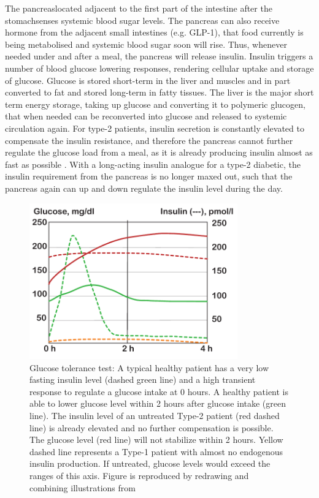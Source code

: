 The pancreas\DIFaddbegin \DIFadd{, }\DIFaddend located adjacent to the first part of the intestine after the stomach\DIFaddbegin \DIFadd{, }\DIFaddend senses systemic blood sugar levels. The pancreas can also receive hormone \DIFdelbegin {}\DIFdelend \DIFaddbegin {}\DIFaddend from the adjacent small intestines (e.g. GLP-1), \DIFaddbegin {}\DIFaddend that food currently is being metabolised and systemic blood sugar soon will rise. Thus, whenever needed under and after a meal, the pancreas will release insulin. Insulin triggers a number of blood glucose lowering responses, rendering cellular uptake and storage of glucose. Glucose is stored short-term in the liver and muscles and in part converted to fat and stored long-term in fatty tissues. The liver is the major short term energy storage, taking up glucose and converting it to polymeric glucogen, that when needed can be reconverted into glucose and released to systemic circulation again. For type-2 patients, insulin secretion is constantly elevated to compensate \DIFaddbegin {}\DIFaddend the insulin resistance, and therefore the pancreas cannot further regulate the glucose load from a meal, as it is already producing insulin almost as fast as possible \cite{silverthorn2010human}. With a long-acting insulin analogue for a type-2 diabetic, the insulin requirement from the pancreas is no longer maxed out, such that the pancreas again can up and down regulate the insulin level during the day.

\begin{figure}[!htpb]
\includegraphics[width=0.8\textwidth,height=0.8\textheight,keepaspectratio]{graphics/glucoseTolerance.pdf}
\caption{Glucose tolerance test: A typical healthy patient has a very low fasting insulin level (dashed green line) and a high transient response to regulate a glucose intake at 0 hours. A healthy patient is able to lower glucose level within 2 hours after glucose intake (green line). The insulin level of an untreated Type-2 patient (red dashed line) is already elevated and no further compensation is possible. The glucose level (red line) will not stabilize within 2 hours. Yellow dashed line represents a Type-1 patient with almost no endogenous insulin production. If untreated, glucose levels would exceed the ranges of this axis. Figure is reproduced by redrawing and combining illustrations from \cite{silverthorn2010human,caumo2004first}}
\label{glucoseTolerance}
\end{figure}

